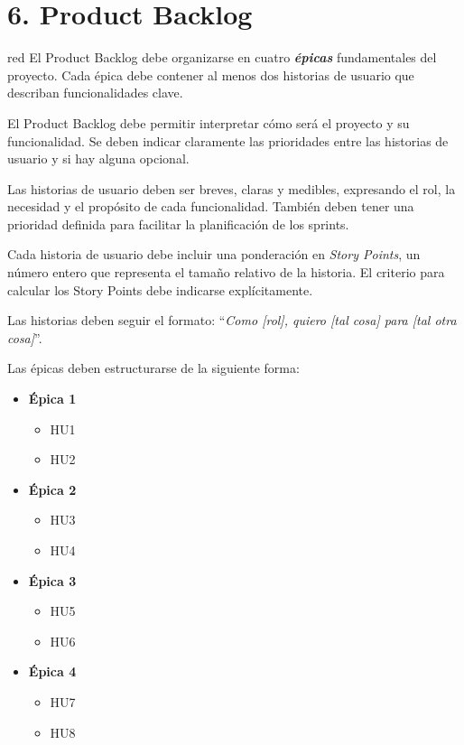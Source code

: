 \section{6. Product Backlog}
\label{sec:backlog}


\begin{consigna}{red}
El Product Backlog debe organizarse en cuatro \textbf{\textit{\'{e}picas}} fundamentales del proyecto. Cada \'{e}pica debe contener al menos dos historias de usuario que describan funcionalidades clave.

El Product Backlog debe permitir interpretar cómo será el proyecto y su funcionalidad. Se deben indicar claramente las prioridades entre las historias de usuario y si hay alguna opcional.

Las historias de usuario deben ser breves, claras y medibles, expresando el rol, la necesidad y el propósito de cada funcionalidad. También deben tener una prioridad definida para facilitar la planificación de los sprints.

Cada historia de usuario debe incluir una ponderación en \textit{Story Points}, un número entero que representa el tama\~no relativo de la historia. El criterio para calcular los Story Points debe indicarse explícitamente.

Las historias deben seguir el formato: ``\textit{Como [rol], quiero [tal cosa] para [tal otra cosa]}''.

Las \'{e}picas deben estructurarse de la siguiente forma:

\begin{itemize}
  \item \textbf{\'{E}pica 1}
    \begin{itemize}
      \item HU1
      \item HU2
    \end{itemize}
  \item \textbf{\'{E}pica 2}
    \begin{itemize}
      \item HU3
      \item HU4
    \end{itemize}
  \item \textbf{\'{E}pica 3}
    \begin{itemize}
      \item HU5
      \item HU6
    \end{itemize}
  \item \textbf{\'{E}pica 4}
    \begin{itemize}
      \item HU7
      \item HU8
    \end{itemize}
\end{itemize}


\end{consigna}
